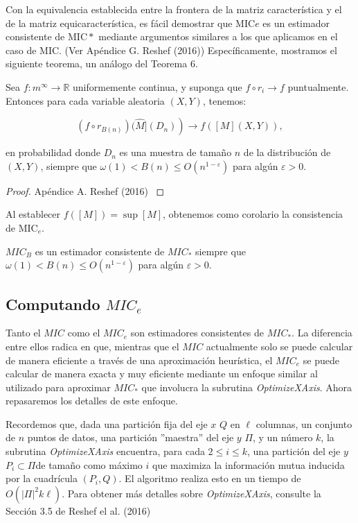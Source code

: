 	Con la equivalencia establecida entre la frontera de la matriz caracter\'istica y el de la matriz equicaracter\'istica, es f\'acil demostrar que $\mathrm{MIC}e$ es un estimador consistente de $\mathrm{MIC}*$ mediante argumentos similares a los que aplicamos en el caso de MIC. (Ver Ap\'endice G. Reshef (2016)\cite{Reshef2016}) Espec\'ificamente, mostramos el siguiente teorema, un an\'alogo del Teorema 6.
	
	\begin{thm}
		Sea $f: m^{\infty} \rightarrow \mathbb{R}$ uniformemente continua, y suponga que $f \circ r_i \rightarrow f$ puntualmente. Entonces para cada variable aleatoria $(X, Y)$, tenemos:

		$$
		\left.\left(f \circ r_{B(n)}\right)(\widehat{M}]\left(D_n\right)\right) \rightarrow f([M](X, Y)),
		$$

		en probabilidad donde $D_n$ es una muestra de tama\~no $n$ de la distribuci\'on de $(X, Y)$, siempre que $\omega(1)<B(n) \leq O\left(n^{1-\varepsilon}\right)$ para alg\'un $\varepsilon>0$.
	\end{thm}
	\begin{proof}
		Ap\'endice A. Reshef (2016) \cite{Reshef2016}
	\end{proof}

	Al establecer $f([M])=\sup [M]$, obtenemos como corolario la consistencia de $\mathrm{MIC}_e$.
	
	\begin{cor}
		$M I C_{B}$ es un estimador consistente de $M I C_*$ siempre que $\omega(1)<B(n) \leq O\left(n^{1-\varepsilon}\right)$ para alg\'un $\varepsilon>0$.
	\end{cor}

	\subsection[computando mic e ]{Computando $MIC_e$}

	Tanto el $MIC$ como el $MIC_e$ son estimadores consistentes de $MIC_*$. La diferencia entre ellos radica en que, mientras que el $MIC$ actualmente solo se puede calcular de manera eficiente a trav\'es de una aproximaci\'on heur\'istica, el $MIC_e$ se puede calcular de manera exacta y muy eficiente mediante un enfoque similar al utilizado para aproximar $MIC_*$ que involucra la subrutina \textit{OptimizeXAxis}. Ahora repasaremos los detalles de este enfoque.

	Recordemos que, dada una partici\'on fija del eje $x$ $Q$ en $\ell$ columnas, un conjunto de $n$ puntos de datos, una partici\'on ''maestra'' del eje $y$ $\Pi$, y un n\'umero $k$, la subrutina \textit{OptimizeXAxis} encuentra, para cada $2 \leq i \leq k$, una partici\'on del eje $y$ $P_i \subset \Pi $de tama\~no como m\'aximo $i$ que maximiza la informaci\'on mutua inducida por la cuadr\'icula $(P_i, Q)$. El algoritmo realiza esto en un tiempo de $O(|\Pi|^2k\ell)$. Para obtener m\'as detalles sobre \textit{OptimizeXAxis}, consulte la Secci\'on 3.5 de Reshef el al. (2016) \cite{Reshef2016} 

